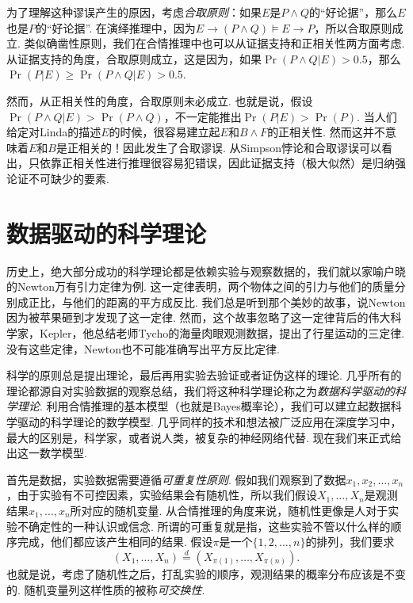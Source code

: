 为了理解这种谬误产生的原因，考虑\emph{合取原则}：如果$E$是$P\wedge Q$的``好论据''，那么$E$也是$P$的``好论据''. 在演绎推理中，因为$E\to(P\wedge Q)\models E\to P$，所以合取原则成立. 类似确凿性原则，我们在合情推理中也可以从证据支持和正相关性两方面考虑. 从证据支持的角度，合取原则成立，这是因为，如果$\Pr(P\wedge Q|E)>0.5$，那么$\Pr(P|E)\geq \Pr(P\wedge Q|E)>0.5$.

然而，从正相关性的角度，合取原则未必成立. 也就是说，假设$\Pr(P\wedge Q|E)>\Pr(P\wedge Q)$，不一定能推出$\Pr(P|E)>\Pr(P)$. 当人们给定对Linda的描述$E$的时候，很容易建立起$E$和$B\wedge F$的正相关性. 然而这并不意味着$E$和$B$是正相关的！因此发生了合取谬误. 从Simpson悖论和合取谬误可以看出，只依靠正相关性进行推理很容易犯错误，因此证据支持（极大似然）是归纳强论证不可缺少的要素.

\section{数据驱动的科学理论}

历史上，绝大部分成功的科学理论都是依赖实验与观察数据的，我们就以家喻户晓的Newton万有引力定律为例. 这一定律表明，两个物体之间的引力与他们的质量分别成正比，与他们的距离的平方成反比. 我们总是听到那个美妙的故事，说Newton因为被苹果砸到才发现了这一定律. 然而，这个故事忽略了这一定律背后的伟大科学家，Kepler，他总结老师Tycho的海量肉眼观测数据，提出了行星运动的三定律. 没有这些定律，Newton也不可能准确写出平方反比定律. 

科学的原则总是提出理论，最后再用实验去验证或者证伪这样的理论. 几乎所有的理论都源自对实验数据的观察总结，我们将这种科学理论称之为\emph{数据科学驱动的科学理论}. 利用合情推理的基本模型（也就是Bayes概率论），我们可以建立起数据科学驱动的科学理论的数学模型. 几乎同样的技术和想法被广泛应用在深度学习中，最大的区别是，科学家，或者说人类，被复杂的神经网络代替. 现在我们来正式给出这一数学模型. 

首先是数据，实验数据需要遵循\emph{可重复性原则}. 假如我们观察到了数据$x_1,x_2,\dots,x_n$，由于实验有不可控因素，实验结果会有随机性，所以我们假设$X_1,\dots,X_n$是观测结果$x_1,\dots,x_n$所对应的随机变量. 从合情推理的角度来说，随机性更像是人对于实验不确定性的一种认识或信念. 所谓的可重复就是指，这些实验不管以什么样的顺序完成，他们都应该产生相同的结果. 假设$\pi$是一个$\{1,2,\dots,n\}$的排列，我们要求
\[
    (X_1,\dots,X_n)\stackrel{d}{=}(X_{\pi(1)},\dots,X_{\pi(n)}).
\]
也就是说，考虑了随机性之后，打乱实验的顺序，观测结果的概率分布应该是不变的. 随机变量列这样性质的被称\emph{可交换性}. 

